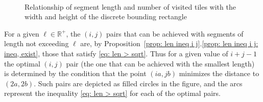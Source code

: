 \documentclass[12pt, a4paper]{article}
\newcommand{\len}{\ell} %
\begin{document}
\begin{figure}
\centering%
\\%
\centering%
%
\caption{Relationship of segment length and number of visited tiles with the width and height of the discrete bounding rectangle
}%
\label{fig: ijLS}%
\end{figure}%

For a given $\len \in \mathbb R^+$, the $(i,j)$ pairs that can be achieved with segments of length not exceeding $\len$ are, by Proposition~\ref{prop: len ineq i j}.\ref{prop: len ineq i j: ineq, exist}, those that satisfy \eqref{eq: len > sqrt}. Thus for a given value of $i+j-1$ the optimal $(i,j)$ pair (the one that can be achieved with the smallest length) is determined by the condition that the point $(ia,jb)$ minimizes the distance to $(2a,2b)$. Such pairs are depicted as filled circles in the figure, and the arcs represent the inequality \eqref{eq: len > sqrt} for each of the optimal pairs.
\end{document}
